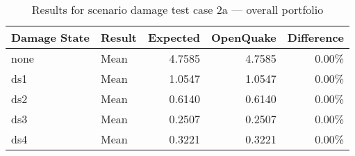 \begin{table}[htbp]

\centering
\begin{tabular}{ l l r r r }

\hline
\rowcolor{anti-flashwhite}
\bf{Damage State} & \bf{Result} & \bf{Expected} & \bf{OpenQuake} & \bf{Difference}\\
\hline
none & Mean & 4.7585 & 4.7585 & 0.00\% \\
 ds1 & Mean & 1.0547 & 1.0547 & 0.00\% \\
 ds2 & Mean & 0.6140 & 0.6140 & 0.00\% \\
 ds3 & Mean & 0.2507 & 0.2507 & 0.00\% \\
 ds4 & Mean & 0.3221 & 0.3221 & 0.00\% \\
\hline
\end{tabular}

\caption{Results for scenario damage test case 2a — overall portfolio}
\label{tab:result-sd-2a-total}
\end{table}